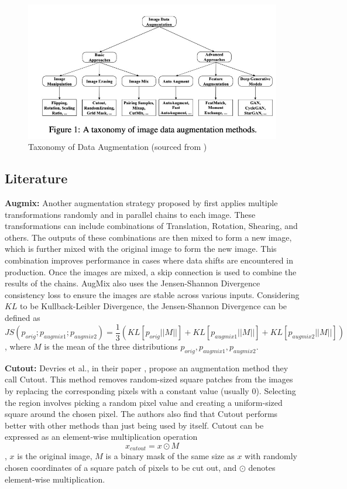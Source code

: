 \begin{figure}[!htb]
    \centering
    \includegraphics[width=.9\textwidth]{images/data_aug_categories.png}
    \caption{Taxonomy of Data Augmentation (sourced from \cite{yangImageDataAugmentation2022})}
    \label{fig:categorization_augmentation}
\end{figure}

\subsection{Literature}
\textbf{Augmix: }
Another augmentation strategy proposed by \cite{hendrycksAugMixSimpleData2020} first applies multiple transformations randomly and in parallel chains to each image. These transformations can include combinations of Translation, Rotation, Shearing, and others. The outputs of these combinations are then mixed to form a new image, which is further mixed with the original image to form the new image. This combination improves performance in cases where data shifts are encountered in production. Once the images are mixed, a skip connection is used to combine the results of the chains. AugMix also uses the Jensen-Shannon Divergence consistency loss \cite{linDivergenceMeasuresBased} to ensure the images are stable across various inputs. Considering $KL$ to be Kullback-Leibler Divergence, the Jensen-Shannon Divergence can be defined as $$
    JS(p_{orig}; p_{augmix1};p_{augmix2}) = \frac{1}{3}(KL[p_{orig}||M||]+KL[p_{augmix1}||M||]+KL[p_{augmix2}||M||])
$$, where $M$ is the mean of the three distributions $p_{orig}, p_{augmix1}, p_{augmix2}$.

\textbf{Cutout: }
Devries et al., in their paper \cite{devriesImprovedRegularizationConvolutional2017}, propose an augmentation method they call Cutout. This method removes random-sized square patches from the images by replacing the corresponding pixels with a constant value (usually 0). Selecting the region involves picking a random pixel value and creating a uniform-sized square around the chosen pixel. The authors also find that Cutout performs better with other methods than just being used by itself. Cutout can be expressed as an element-wise multiplication operation $$x_{cutout} = x \odot M$$,
$x$ is the original image, $M$ is a binary mask of the same size as $x$ with randomly chosen coordinates of a square patch of pixels to be cut out, and $\odot$ denotes element-wise multiplication.

